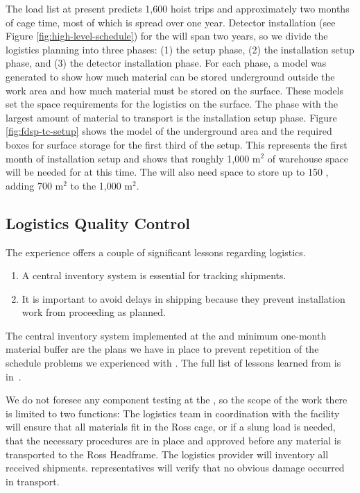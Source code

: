 The load list at present predicts 1,600 hoist trips and approximately two  months of cage time, most of which is spread over one year. 
Detector installation (see Figure \ref{fig:high-level-schedule}) for the  will span two years, so we divide the logistics planning into three phases: (1) the  setup phase, (2) the installation setup phase, and (3) the detector installation phase. 
For each phase, a \threed model was generated to show how much material can be stored underground outside the work area and how much material must be stored on the surface. 
These models set the space requirements for the logistics on the surface. 
The phase with the largest amount of material to transport is the installation setup phase.  
Figure \ref{fig:fdsp-tc-setup} shows the model of the underground area and the required boxes for surface storage for the first third of the setup. 
This represents the first month of installation setup and shows that roughly 1,000 m$^2$ of warehouse space will be needed for  at this time.  The  will also need space to store up to 150 , 
adding 700 m$^2$ to the 1,000 m$^2$. 


\subsection{Logistics Quality Control}
\label{sec:fdsp-tc-log-qaqc}


 
The  experience offers a couple of significant lessons regarding logistics.

\begin{enumerate}
\item A central inventory system is essential for tracking  shipments.
\item It is important to avoid delays in shipping because they prevent installation work from  proceeding as planned. 
\end{enumerate}

The central inventory system  implemented at the   and minimum one-month material buffer are the plans we have in place to prevent repetition of the schedule problems we experienced with .   The full list of lessons learned from  is in~\cite{bib:docdb8255}. 

We do not foresee any component testing at the , so the scope of the  work there is limited to two functions: 
The  logistics team in coordination with the facility will ensure that all materials fit in the Ross cage, or if a slung load is needed, that the necessary procedures are in place and approved before any material is transported to the Ross Headframe.  
The logistics provider will inventory all received shipments.  representatives will verify that no obvious damage occurred in transport.

